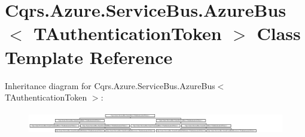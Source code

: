\hypertarget{classCqrs_1_1Azure_1_1ServiceBus_1_1AzureBus}{}\section{Cqrs.\+Azure.\+Service\+Bus.\+Azure\+Bus$<$ T\+Authentication\+Token $>$ Class Template Reference}
\label{classCqrs_1_1Azure_1_1ServiceBus_1_1AzureBus}
Inheritance diagram for Cqrs.\+Azure.\+Service\+Bus.\+Azure\+Bus$<$ T\+Authentication\+Token $>$\+:\begin{figure}[H]
\begin{center}
\leavevmode
\includegraphics[height=1.013575cm]{classCqrs_1_1Azure_1_1ServiceBus_1_1AzureBus}
\end{center}
\end{figure}
